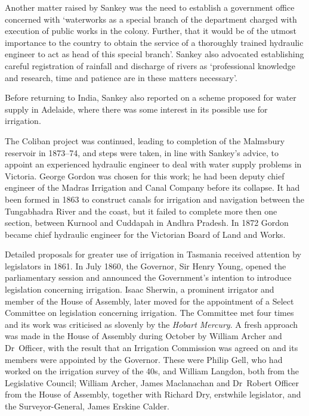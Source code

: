 Another matter raised by Sankey was the need to establish a government
office concerned with `waterworks as a special branch of the
department charged with execution of public works in the colony.
Further, that it would be of the utmost importance to the country to
obtain the service of a thoroughly trained hydraulic engineer to act
as head of this special branch'.  Sankey also advocated establishing
careful registration of rainfall and discharge of rivers as
`professional knowledge and research, time and patience are in these
matters necessary'.

Before returning to India, Sankey also reported on a scheme proposed
for water supply in Adelaide, where there was some interest in its
possible use for irrigation.

The Coliban project was continued, leading to completion of the
Malmsbury reservoir in 1873--74, and steps were taken, in line with
Sankey's advice, to appoint an experienced hydraulic engineer to deal
with water supply problems in Victoria.  George Gordon was chosen for
this work; he had been deputy chief engineer of the Madras Irrigation
and Canal Company before its collapse.  It had been formed in 1863 to
construct canals for irrigation and navigation between the Tungabhadra
River and the coast, but it failed to complete more then one section,
between Kurnool and Cuddapah in Andhra Pradesh.  In 1872 Gordon became
chief hydraulic engineer for the Victorian Board of Land and
Works.

Detailed proposals for greater use of irrigation in Tasmania received
attention by legislators in 1861.  In July 1860, the Governor, Sir
Henry Young, opened the parliamentary session and announced the
Government's intention to introduce legislation concerning irrigation.
Isaac Sherwin, a prominent irrigator and member of the House of
Assembly, later moved for the appointment of a Select Committee on
legislation concerning irrigation. The Committee met four times and
its work was criticised as slovenly by the \textsl{Hobart Mercury}.  A
fresh approach was made in the House of Assembly during October by
William Archer and Dr~Officer, with the result that an Irrigation
Commission was agreed on and its members were appointed by the
Governor.  These were Philip Gell, who had worked on the irrigation
survey of the 40s, and William Langdon, both from the Legislative
Council; William Archer, James Maclanachan and Dr~Robert Officer from
the House of Assembly, together with Richard Dry, erstwhile
legislator, and the Surveyor-General, James Erskine
Calder.

